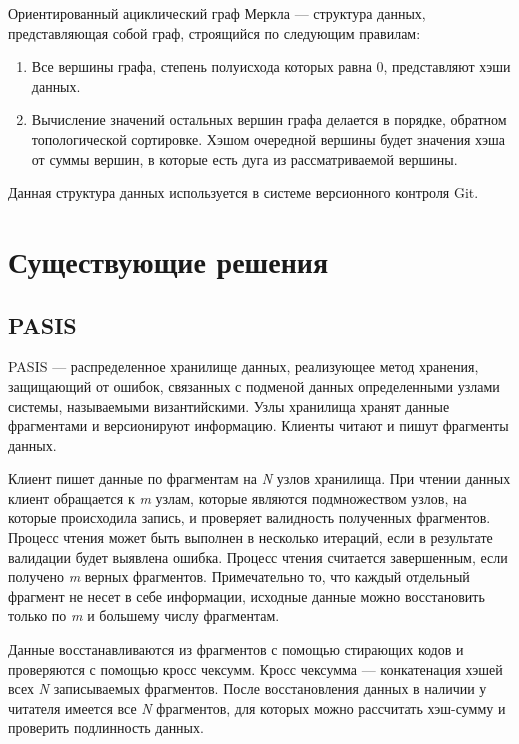 Ориентированный ациклический граф Меркла\cite{merkledag} --- структура данных, представляющая собой граф, строящийся по следующим правилам:
\begin{enumerate}
    \item Все вершины графа, степень полуисхода\cite{graphs} которых равна 0, представляют хэши данных.
    \item Вычисление значений остальных вершин графа делается в порядке, обратном топологической сортировке\cite{topsort}. Хэшом очередной вершины будет значения хэша от суммы вершин, в которые есть дуга из рассматриваемой вершины.
\end{enumerate}

%
Данная структура данных используется в системе версионного контроля Git\cite{git}.

\section{Существующие решения}

\subsection{PASIS}

\label{par:pasis}

PASIS\cite{pasis} --- распределенное хранилище данных, реализующее метод хранения, защищающий от ошибок, связанных с подменой данных определенными узлами системы, называемыми византийскими. Узлы хранилища хранят данные фрагментами и версионируют информацию. Клиенты читают и пишут фрагменты данных.

Клиент пишет данные по фрагментам на \textit{N} узлов хранилища. При чтении данных клиент обращается к \textit{m} узлам, которые являются подмножеством узлов, на которые происходила запись, и проверяет валидность полученных фрагментов. Процесс чтения может быть выполнен в несколько итераций, если в результате валидации будет выявлена ошибка. Процесс чтения считается завершенным, если получено \textit{m} верных фрагментов. Примечательно то, что каждый отдельный фрагмент не несет в себе информации, исходные данные можно восстановить только по \textit{m} и большему числу фрагментам.

Данные восстанавливаются из фрагментов с помощью стирающих кодов\cite{erasurecode} и проверяются с помощью кросс чексумм. Кросс чексумма --- конкатенация хэшей всех \textit{N} записываемых фрагментов. После восстановления данных в наличии у читателя имеется все \textit{N} фрагментов, для которых можно рассчитать хэш-сумму и проверить подлинность данных.

